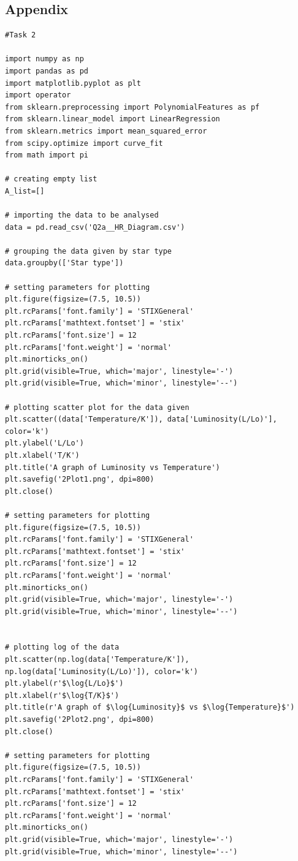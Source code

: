 \documentclass[12pt, a4paper]{article}
\begin{document}
\subsection{Appendix}
\begin{verbatim}
#Task 2

import numpy as np
import pandas as pd
import matplotlib.pyplot as plt
import operator
from sklearn.preprocessing import PolynomialFeatures as pf
from sklearn.linear_model import LinearRegression
from sklearn.metrics import mean_squared_error
from scipy.optimize import curve_fit
from math import pi

# creating empty list
A_list=[]

# importing the data to be analysed
data = pd.read_csv('Q2a__HR_Diagram.csv')

# grouping the data given by star type
data.groupby(['Star type'])

# setting parameters for plotting
plt.figure(figsize=(7.5, 10.5))
plt.rcParams['font.family'] = 'STIXGeneral'
plt.rcParams['mathtext.fontset'] = 'stix'
plt.rcParams['font.size'] = 12
plt.rcParams['font.weight'] = 'normal'
plt.minorticks_on()
plt.grid(visible=True, which='major', linestyle='-')
plt.grid(visible=True, which='minor', linestyle='--')

# plotting scatter plot for the data given
plt.scatter((data['Temperature/K']), data['Luminosity(L/Lo)'], color='k')
plt.ylabel('L/Lo')
plt.xlabel('T/K')
plt.title('A graph of Luminosity vs Temperature')
plt.savefig('2Plot1.png', dpi=800)
plt.close()

# setting parameters for plotting
plt.figure(figsize=(7.5, 10.5))
plt.rcParams['font.family'] = 'STIXGeneral'
plt.rcParams['mathtext.fontset'] = 'stix'
plt.rcParams['font.size'] = 12
plt.rcParams['font.weight'] = 'normal'
plt.minorticks_on()
plt.grid(visible=True, which='major', linestyle='-')
plt.grid(visible=True, which='minor', linestyle='--')


# plotting log of the data
plt.scatter(np.log(data['Temperature/K']), 
np.log(data['Luminosity(L/Lo)']), color='k')
plt.ylabel(r'$\log{L/Lo}$')
plt.xlabel(r'$\log{T/K}$')
plt.title(r'A graph of $\log{Luminosity}$ vs $\log{Temperature}$')
plt.savefig('2Plot2.png', dpi=800)
plt.close()

# setting parameters for plotting
plt.figure(figsize=(7.5, 10.5))
plt.rcParams['font.family'] = 'STIXGeneral'
plt.rcParams['mathtext.fontset'] = 'stix'
plt.rcParams['font.size'] = 12
plt.rcParams['font.weight'] = 'normal'
plt.minorticks_on()
plt.grid(visible=True, which='major', linestyle='-')
plt.grid(visible=True, which='minor', linestyle='--')


\end{verbatim}
\end{document}
